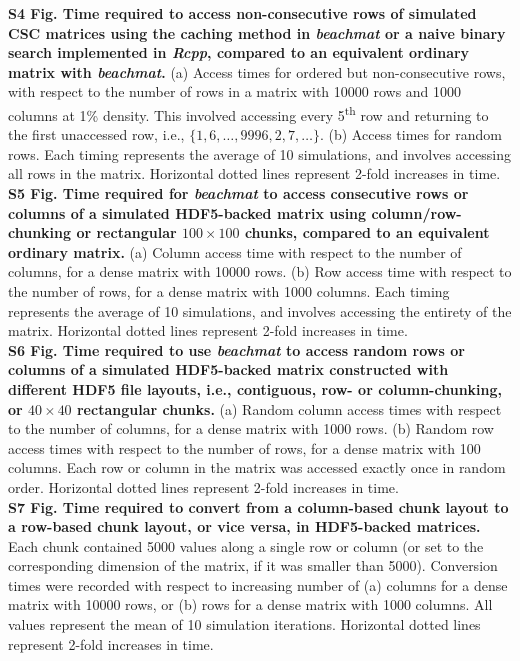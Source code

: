 \documentclass[10pt,letterpaper]{article}
\newcommand{\beachmat}{\textit{beachmat}}
\begin{document}
\noindent
\textbf{S4 Fig. Time required to access non-consecutive rows of simulated CSC matrices using the caching method in \beachmat{} or a naive binary search implemented in \textit{Rcpp}, compared to an equivalent ordinary matrix with \beachmat{}.}
(a) Access times for ordered but non-consecutive rows, with respect to the number of rows in a matrix with 10000 rows and 1000 columns at 1\% density.
This involved accessing every 5\textsuperscript{th} row and returning to the first unaccessed row, i.e., $\{1, 6, \ldots, 9996, 2, 7, \ldots\}$.
(b) Access times for random rows.
Each timing represents the average of 10 simulations, and involves accessing all rows in the matrix.
Horizontal dotted lines represent 2-fold increases in time.
\\[0.05in]

\noindent
\textbf{S5 Fig. Time required for \beachmat{} to access consecutive rows or columns of a simulated HDF5-backed matrix using column/row-chunking or rectangular $100\times100$ chunks, compared to an equivalent ordinary matrix.}
(a) Column access time with respect to the number of columns, for a dense matrix with 10000 rows.
(b) Row access time with respect to the number of rows, for a dense matrix with 1000 columns.
Each timing represents the average of 10 simulations, and involves accessing the entirety of the matrix.
Horizontal dotted lines represent 2-fold increases in time.
\\[0.05in]

\noindent
\textbf{S6 Fig. Time required to use \beachmat{} to access random rows or columns of a simulated HDF5-backed matrix constructed with different HDF5 file layouts, 
i.e., contiguous, row- or column-chunking, or $40\times40$ rectangular chunks.}
(a) Random column access times with respect to the number of columns, for a dense matrix with 1000 rows.
(b) Random row access times with respect to the number of rows, for a dense matrix with 100 columns.
Each row or column in the matrix was accessed exactly once in random order.
Horizontal dotted lines represent 2-fold increases in time.
\\[0.05in]

\noindent
\textbf{S7 Fig. Time required to convert from a column-based chunk layout to a row-based chunk layout, or vice versa, in HDF5-backed matrices.}
Each chunk contained 5000 values along a single row or column (or set to the corresponding dimension of the matrix, if it was smaller than 5000).
Conversion times were recorded with respect to increasing number of (a) columns for a dense matrix with 10000 rows, or (b) rows for a dense matrix with 1000 columns.
All values represent the mean of 10 simulation iterations.
Horizontal dotted lines represent 2-fold increases in time.
\\[0.05in]
\end{document}
